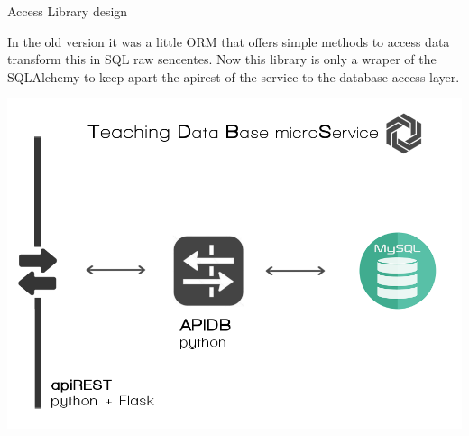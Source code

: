 Access Library design

In the old version it was a little ORM that offers simple methods
to access data transform this in SQL raw sencentes. Now this library
is only a wraper of the SQLAlchemy to keep apart the apirest of the
service to the database access layer.

\begin{center}
\includegraphics[scale=0.35]{img/graphics/tdbms.png}
\end{center}

